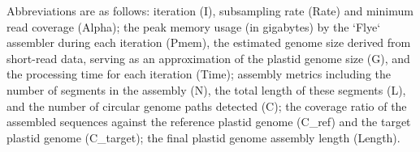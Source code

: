 \begingroup
\scriptsize
\setlength{\parskip}{2pt}

Abbreviations are as follows: iteration (I), subsampling rate (Rate) and minimum read coverage (Alpha);
the peak memory usage (in gigabytes) by the `Flye` assembler during each iteration (Pmem),
the estimated genome size derived from short-read data, serving as an approximation of the plastid genome size (G), and
the processing time for each iteration (Time);
assembly metrics including the number of segments in the assembly (N), the total length of these segments (L), and
the number of circular genome paths detected (C);
the coverage ratio of the assembled sequences against the reference plastid genome (C_ref) and the target plastid genome (C_target);
the final plastid genome assembly length (Length).

\endgroup

